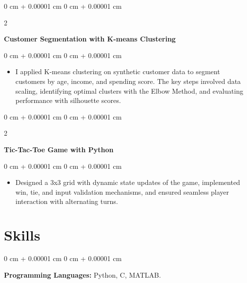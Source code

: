 \documentclass[10pt, letterpaper]{article}
\newenvironment{highlights}{
    \begin{itemize}[
        topsep=0.10 cm,
        parsep=0.10 cm,
        partopsep=0pt,
        itemsep=0pt,
        leftmargin=0 cm + 10pt
    ]
}{
    \end{itemize}
} %
\newenvironment{onecolentry}{
    \begin{adjustwidth}{
        0 cm + 0.00001 cm
    }{
        0 cm + 0.00001 cm
    }
}{
    \end{adjustwidth}
} %
\newenvironment{twocolentry}[2][]{
    \onecolentry
    \def\secondColumn{#2}
    \setcolumnwidth{\fill, 4.5 cm}
    \begin{paracol}{2}
}{
    \switchcolumn \raggedleft \secondColumn
    \end{paracol}
    \endonecolentry
} %
\begin{document}
        \vspace{0.2 cm}

        \begin{twocolentry}{
        }
            \textbf{Customer Segmentation with K-means Clustering
}\end{twocolentry}

        \vspace{0.10 cm}
        \begin{onecolentry}
            \begin{highlights}
                \item I applied K-means clustering on synthetic customer data to segment customers by age, income, and spending score. The key steps involved data scaling, identifying optimal clusters with the Elbow Method, and evaluating performance with silhouette scores.
            \end{highlights}
        \end{onecolentry}
        
    \vspace{0.5 cm}

        \begin{twocolentry}{
        }
            \textbf{Tic-Tac-Toe Game with Python}\end{twocolentry}

        \vspace{0.10 cm}
        \begin{onecolentry}
            \begin{highlights}
                \item Designed a 3x3 grid with dynamic state updates of the game, implemented win, tie, and input validation mechanisms, and ensured seamless player interaction with alternating turns.
            \end{highlights}
        \end{onecolentry}

    \vspace{0.6 cm}

       \vspace{0.15 cm}
       \section{Skills}   
        \begin{onecolentry}
        \textbf{Programming Languages:} Python, C, MATLAB.
        \end{onecolentry}

        \vspace{0.2 cm}
\end{document}

